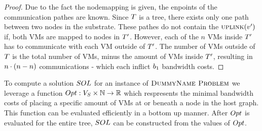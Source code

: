 \begin{proof}
Due to the fact the nodemapping is given, the enpoints of the communication 
pathes are known. Since $T$ is a tree, there exists only one path between 
two nodes in the substrate. These pathes do not contain the 
$\textsc{uplink}(v')$ if, both VMs are mapped to nodes in $T'$. 
However, each of the $n$ VMs inside $T'$ has to communicate with each VM 
outside of $T'$. The number of VMs outside of $T$ is the total number 
of VMs, minus the amount of VMs inside $T'$, resulting in $n \cdot (n - 
n)$ communications - which each inflict $b_1$ bandwidth costs.
\end{proof}
To compute a solution $SOL$ for an instance of $\textsc{DummyName Problem}$ we leverage a
function $Opt : V_S \times \mathbb{N} \rightarrow \mathbb{R}$ 
which respresents the minimal bandwidth costs of placing a specific amount of 
VMs at or beneath a node in the host graph. This function can be evaluated 
efficiently in a bottom up manner. After $Opt$ is evaluated for the entire 
tree, $SOL$ can be constructed from the values of $Opt$.

%
\newcommand{\NodesToProcess}{\ensuremath{\textsc{nodesToProcess}}}


